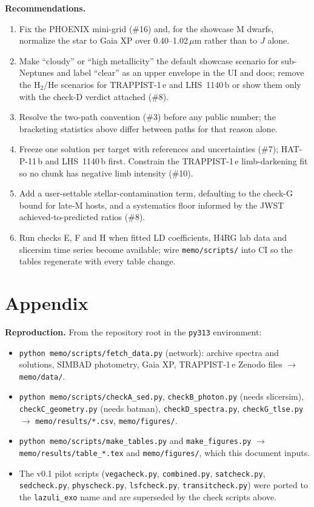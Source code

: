 \documentclass[11pt]{article}
\begin{document}
\textbf{Recommendations.}
\begin{enumerate}[leftmargin=*,itemsep=1pt]
  \item Fix the PHOENIX mini-grid (\#16) and, for the showcase M dwarfs, normalize the star to Gaia XP over 0.40--1.02\,$\mu$m rather than to $J$ alone.
  \item Make ``cloudy'' or ``high metallicity'' the default showcase scenario for sub-Neptunes and label ``clear'' as an upper envelope in the UI and docs; remove the H$_2$/He scenarios for TRAPPIST-1\,e and LHS~1140\,b or show them only with the check-D verdict attached (\#8).
  \item Resolve the two-path convention (\#3) before any public number; the bracketing statistics above differ between paths for that reason alone.
  \item Freeze one solution per target with references and uncertainties (\#7); HAT-P-11\,b and LHS~1140\,b first. Constrain the TRAPPIST-1\,e limb-darkening fit so no chunk has negative limb intensity (\#10).
  \item Add a user-settable stellar-contamination term, defaulting to the check-G bound for late-M hosts, and a systematics floor informed by the JWST achieved-to-predicted ratios (\#8).
  \item Run checks E, F and H when fitted LD coefficients, H4RG lab data and slicersim time series become available; wire \texttt{memo/scripts/} into CI so the tables regenerate with every table change.
\end{enumerate}

\section*{Appendix}

\textbf{Reproduction.} From the repository root in the \texttt{py313} environment:
\begin{itemize}[leftmargin=*,itemsep=1pt]
  \item \texttt{python memo/scripts/fetch\_data.py} (network): archive spectra and solutions, SIMBAD photometry, Gaia XP, TRAPPIST-1\,e Zenodo files $\rightarrow$ \texttt{memo/data/}.
  \item \texttt{python memo/scripts/checkA\_sed.py}, \texttt{checkB\_photon.py} (needs slicersim), \texttt{checkC\_geometry.py} (needs batman), \texttt{checkD\_spectra.py}, \texttt{checkG\_tlse.py} $\rightarrow$ \texttt{memo/results/*.csv}, \texttt{memo/figures/}.
  \item \texttt{python memo/scripts/make\_tables.py} and \texttt{make\_figures.py} $\rightarrow$ \texttt{memo/results/table\_*.tex} and \texttt{memo/figures/}, which this document inputs.
  \item The v0.1 pilot scripts (\texttt{vegacheck.py}, \texttt{combined.py}, \texttt{satcheck.py}, \texttt{sedcheck.py}, \texttt{physcheck.py}, \texttt{lsfcheck.py}, \texttt{transitcheck.py}) were ported to the \texttt{lazuli\_exo} name and are superseded by the check scripts above.
\end{itemize}
\end{document}
